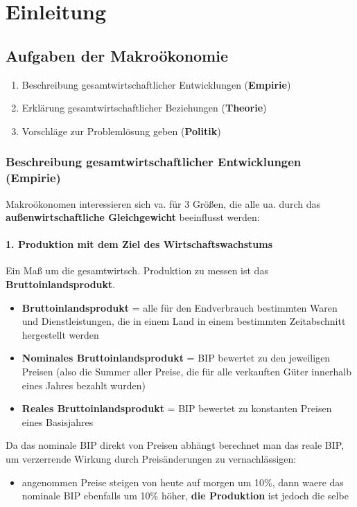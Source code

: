 \documentclass[11pt]{article}
\date{\today}
\title{}
\begin{document}
\tableofcontents

\newpage
\section{Einleitung}
\label{sec:org1fb6bf7}
\subsection{Aufgaben der Makroökonomie}
\label{sec:org5b7dfd4}
\begin{enumerate}
\item Beschreibung gesamtwirtschaftlicher Entwicklungen (\textbf{Empirie})
\item Erklärung gesamtwirtschaftlicher Beziehungen (\textbf{Theorie})
\item Vorschläge zur Problemlösung geben (\textbf{Politik})
\end{enumerate}

\subsubsection{Beschreibung gesamtwirtschaftlicher Entwicklungen (Empirie)}
\label{sec:orgb90c5ac}

Makroökonomen interessieren sich va. für 3 Größen, die alle ua. durch das \textbf{außenwirtschaftliche Gleichgewicht} beeinflusst werden:

\paragraph{1. Produktion mit dem Ziel des Wirtschaftswachstums}\mbox{}

Ein Maß um die gesamtwirtsch. Produktion zu messen ist das \textbf{Bruttoinlandsprodukt}.
\begin{itemize}
\item \textbf{Bruttoinlandsprodukt} = alle für den Endverbrauch bestimmten Waren und Dienstleistungen, die in einem Land in einem bestimmten Zeitabschnitt hergestellt werden
\item \textbf{Nominales Bruttoinlandsprodukt} = BIP bewertet zu den jeweiligen Preisen (also die Summer aller Preise, die für alle verkauften Güter innerhalb eines Jahres bezahlt wurden)
\item \textbf{Reales Bruttoinlandsprodukt} = BIP bewertet zu konstanten Preisen eines Basisjahres
\end{itemize}

Da das nominale BIP direkt von Preisen abhängt berechnet man das reale BIP, um verzerrende Wirkung durch Preisänderungen zu vernachlässigen:
\begin{itemize}
\item angenommen Preise steigen von heute auf morgen um 10\%, dann waere das nominale BIP ebenfalls um 10\% höher, \textbf{die Produktion} ist jedoch die selbe
\end{itemize}
\end{document}
